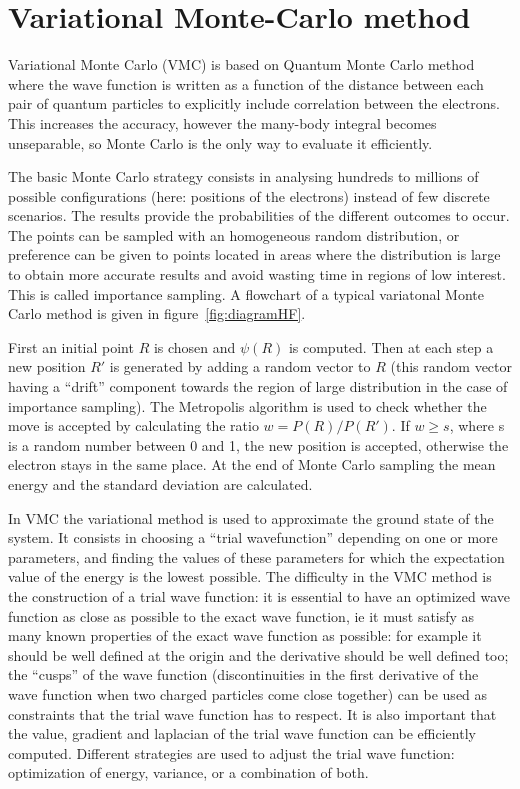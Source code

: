 \section{Variational Monte-Carlo method}
Variational Monte Carlo (VMC) is based on Quantum Monte Carlo method where the wave function is written as a function of the distance between each pair of quantum particles to explicitly include correlation between the electrons. This increases the accuracy, however the many-body integral becomes unseparable, so Monte Carlo is the only way to evaluate it efficiently.

The basic Monte Carlo strategy consists in analysing hundreds to millions of possible configurations (here: positions of the electrons) instead of few discrete scenarios. The results provide the probabilities of the different outcomes to occur. The points can be sampled with an homogeneous random distribution, or preference can be given to points located in areas where the distribution is large to obtain more accurate results and avoid wasting time in regions of low interest. This is called importance sampling. A flowchart of a typical variatonal Monte Carlo method is given in figure~\ref{fig:diagramHF}.

First an initial point $R$ is chosen and $\psi(R)$ is computed. Then at each step a new position $R'$ is generated by adding a random vector to $R$ (this random vector having a ``drift'' component towards the region of large distribution in the case of importance sampling). The Metropolis algorithm is used to check whether the move is accepted by calculating the ratio $w = P(R) / P(R')$. If $w \geq s$, where s is a random number between 0 and 1, the new position is accepted, otherwise the electron stays in the same place. At the end of Monte Carlo sampling the mean energy and the standard deviation are calculated.

In VMC the variational method is used to approximate the ground state of the system. It consists in choosing a ``trial wavefunction'' depending on one or more parameters, and finding the values of these parameters for which the expectation value of the energy is the lowest possible.
The difficulty in the VMC method is the construction of a trial wave function: it is essential to have an optimized wave function as close as possible to the exact wave function, ie it must satisfy as many known properties of the exact wave function as possible: for example it should be well defined at the origin and the derivative should be well defined too; the ``cusps'' of the wave function (discontinuities in the first derivative of the wave function when two charged particles come close together) can be used as constraints that the trial wave function has to respect. It is also important that the value, gradient and laplacian of the trial wave function can be efficiently computed.
Different strategies are used to adjust the trial wave function: optimization of energy, variance, or a combination of both.

